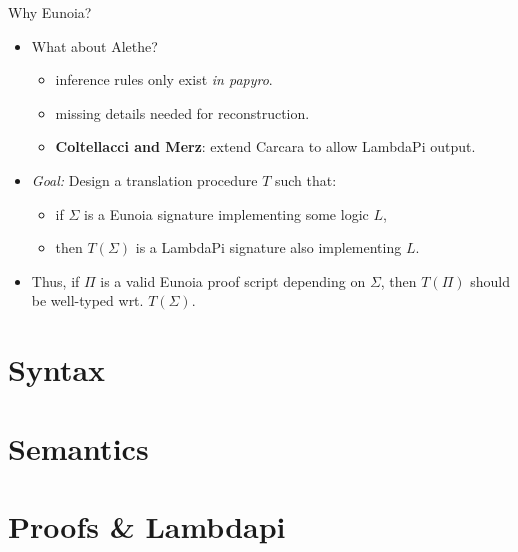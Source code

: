 \documentclass[lualatex, 12pt, handout]{beamer}
\begin{document}
\begin{frame}[fragile]{Why Eunoia?}
	\begin{itemize}
		\item<+-> What about Alethe?
		      \begin{itemize}
			      \item<+-> inference rules only exist \emph{in papyro}.
			      \item<+-> missing details needed for reconstruction.
			      \item<+->
			            \textbf{Coltellacci and Merz}: extend \alert{Carcara}
			            to allow LambdaPi output.
		      \end{itemize}
	\end{itemize}
\end{frame}

\begin{frame}{}
	\begin{itemize}
		\item<+-> \emph{\color{oc-green-9}Goal:}
		      Design a translation procedure $T$ such that:
		      \begin{itemize}
			      \item<+-> if $Σ$ is a Eunoia signature implementing some \alert{logic} $L$,
			      \item<+-> then $T(Σ)$ is a LambdaPi signature also implementing $L$.
			            \\[2mm]
		      \end{itemize}

		\item<+-> Thus, if $Π$ is a valid Eunoia \alert{proof script} depending on $Σ$,
		      then $T(Π)$ should be \alert{well-typed} wrt. $T(Σ)$.
	\end{itemize}
\end{frame}

\section{Syntax}



\section{Semantics}


\section{Proofs \& Lambdapi}










\end{document}
